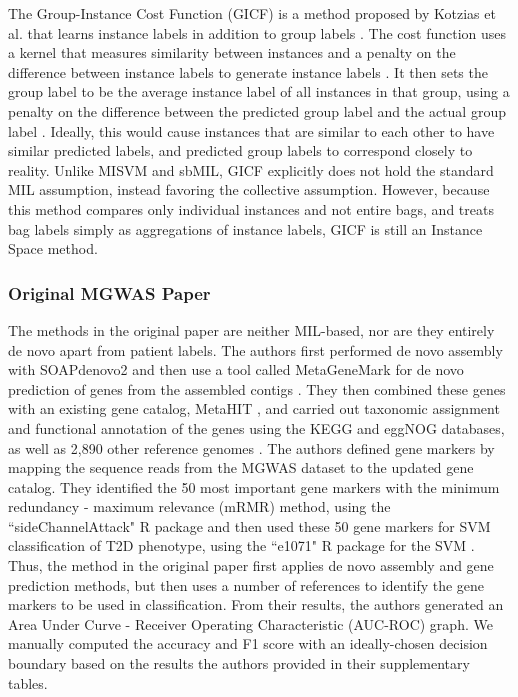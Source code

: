The Group-Instance Cost Function (GICF) is a method proposed by Kotzias et al. that learns instance labels in addition to group labels \cite{kotzias15}. The cost function uses a kernel that measures similarity between instances and a penalty on the difference between instance labels to generate instance labels \cite{kotzias15}. It then sets the group label to be the average instance label of all instances in that group, using a penalty on the difference between the predicted group label and the actual group label \cite{kotzias15}. Ideally, this would cause instances that are similar to each other to have similar predicted labels, and predicted group labels to correspond closely to reality. Unlike MISVM and sbMIL, GICF explicitly does not hold the standard MIL assumption, instead favoring the collective assumption. However, because this method compares only individual instances and not entire bags, and treats bag labels simply as aggregations of instance labels, GICF is still an Instance Space method.

\subsubsection{Original MGWAS Paper}

The methods in the original paper are neither MIL-based, nor are they entirely de novo apart from patient labels. The authors first performed de novo assembly with SOAPdenovo2 \cite{luo12} and then use a tool called MetaGeneMark \cite{zhu10, besemer99} for de novo prediction of genes from the assembled contigs \cite{qin041012}. They then combined these genes with an existing gene catalog, MetaHIT \cite{qin030410}, and carried out taxonomic assignment and functional annotation of the genes using the KEGG \cite{kanehisa00} and eggNOG \cite{powell12} databases, as well as 2,890 other reference genomes \cite{qin041012}. The authors defined gene markers by mapping the sequence reads from the MGWAS dataset to the updated gene catalog. They identified the 50 most important gene markers with the minimum redundancy - maximum relevance (mRMR) \cite{peng05} method, using the ``sideChannelAttack" R package and then used these 50 gene markers for SVM classification of T2D phenotype, using the ``e1071" R package for the SVM \cite{qin041012}. Thus, the method in the original paper first applies de novo assembly and gene prediction methods, but then uses a number of references to identify the gene markers to be used in classification. From their results, the authors generated an Area Under Curve - Receiver Operating Characteristic (AUC-ROC) graph. We manually computed the accuracy and F1 score with an ideally-chosen decision boundary based on the results the authors provided in their supplementary tables. 

